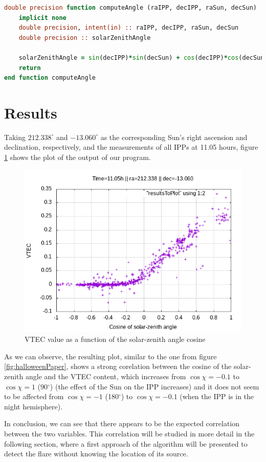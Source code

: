 \begin{minipage}{\linewidth}
\begin{lstlisting}[language=Fortran, caption=Computation of the solar-zenith a angle's cosine]
double precision function computeAngle (raIPP, decIPP, raSun, decSun)
	implicit none
	double precision, intent(in) :: raIPP, decIPP, raSun, decSun
	double precision :: solarZenithAngle
	
	solarZenithAngle = sin(decIPP)*sin(decSun) + cos(decIPP)*cos(decSun)*cos(raIPP - raSun)
	return
end function computeAngle
\end{lstlisting}
\end{minipage}

\section{Results}

Taking $212.338^{\circ}$ and $-13.060^{\circ}$ as the corresponding Sun's right ascension and declination, respectively, and the measurements of all IPPs at 11.05 hours, figure \ref{fig:results} shows the plot of the output of our program.

\begin{figure}[!htb]
\begin{centering}
	\includegraphics[width=0.5\linewidth]{images/ch4/resultSunTest.png}
	\caption{VTEC value as a function of the solar-zenith angle cosine}
	\label{fig:results}
\end{centering}
\end{figure}

As we can observe, the resulting plot, similar to the one from figure \ref{fig:halloweenPaper}, shows a strong corelation between the cosine of the solar-zenith angle and the VTEC content, which increases from $\cos\chi = -0.1$ to $\cos\chi = 1$ (90$^{\circ}$) (the effect of the Sun on the IPP increases) and it does not seem to be affected from $\cos\chi = -1$ (180$^{\circ}$) to $\cos\chi = -0.1$ (when the IPP is in the night hemisphere).

In conclusion, we can see that there appears to be the expected correlation between the two variables. This correlation will be studied in more detail in the following section, where a first approach of the algorithm will be presented to detect the flare without knowing the location of its source.













